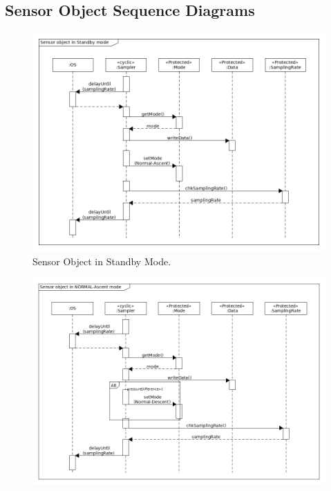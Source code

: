 \documentclass[a4paper,12pt,twoside]{article}
\begin{document}
\begin{appendices}
\begin{landscape}
\subsection{Sensor Object Sequence Diagrams}
\begin{figure}[H]
    \centering
    \includegraphics[height=0.8\textwidth]{appendix/img/sensor-seq-dia-a.png}
    \caption{Sensor Object in Standby Mode.}
    \label{sensora}
\end{figure}
\begin{figure}[H]
    \centering
    \includegraphics[height=0.9\textwidth]{appendix/img/sensor-seq-dia-b.png}

\end{figure}
\end{landscape}
\end{appendices}
\end{document}
